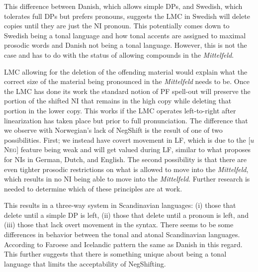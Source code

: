 \documentclass[12pt, letterpaper]{article}
\begin{document}
This difference between Danish, which allows simple DPs, and Swedish, which tolerates full DPs but prefers pronouns, suggests the LMC in Swedish will delete copies until they are just the NI pronoun. This potentially comes down to Swedish being a tonal language and how tonal accents are assigned to maximal prosodic words \citep{myrbergProsodicWordSwedish2013,myrbergProsodicHierarchySwedish2015,riadPhonologySwedish2014} and Danish not being a tonal language. However, this is not the case and has to do with the status of allowing compounds in the \emph{Mittelfeld}.

LMC allowing for the deletion of the offending material would explain what the correct size of the material being pronounced in the \emph{Mittelfeld} needs to be. Once the LMC has done its work the standard notion of PF spell-out will preserve the portion of the shifted NI that remains in the high copy while deleting that portion in the lower copy. This works if the LMC operates left-to-right after linearization has taken place but prior to full pronunciation. The difference that we observe with Norwegian's lack of NegShift is the result of one of two possibilities. First; we instead have covert movement in LF, which is due to the [$u$\textsc{Neg}] feature being weak and will get valued during LF, similar to what \citet{zeijlstraSyntacticallyComplexStatus2011} proposes for NIs in German, Dutch, and English. The second possibility is that there are even tighter prosodic restrictions on what is allowed to move into the \emph{Mittelfeld}, which results in no NI being able to move into the \emph{Mittelfeld}. Further research is needed to determine which of these principles are at work. 

This results in a three-way system in Scandinavian languages: (i) those that delete until a simple DP is left, (ii) those that delete until a pronoun is left, and (iii) those that lack overt movement in the syntax. There seems to be some differences in behavior between the tonal and atonal Scandinavian languages. According to \citet{thrainssonFaroeseOverviewReference2004,thrainssonSyntaxIcelandic2010} Faroese and Icelandic pattern the same as Danish in this regard. This further suggests that there is something unique about being a tonal language that limits the acceptability of NegShifting.
\end{document}
